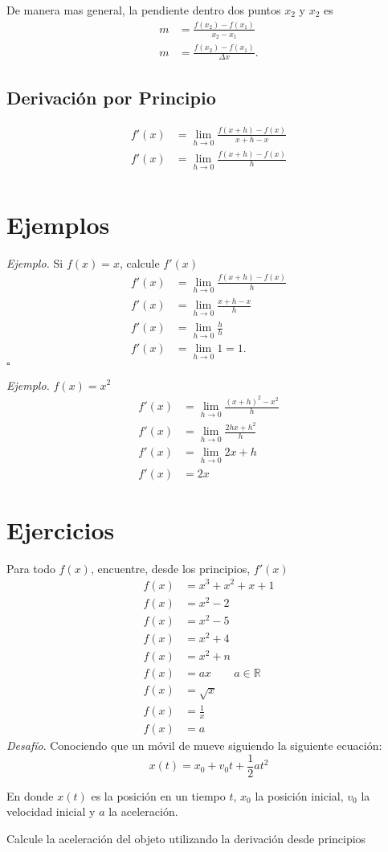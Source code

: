 \documentclass[spanish,12pt]{article}
\begin{document}
De manera mas general, la pendiente dentro dos puntos $x_2$ y $x_2$ es 
\begin{align*}
    m&=\frac{f(x_2)-f(x_1)}{x_2-x_1}\\
    m&=\frac{f(x_2)-f(x_1)}{\Delta x}.
\end{align*}
	\subsection{Derivación por Principio}
	\begin{align*}
	    f'(x)&=\lim_{h\to0}{\frac{f(x+h)-f(x)}{x+h-x}}\\
	    f'(x)&=\lim_{h\to0}{\frac{f(x+h)-f(x)}{h}}\\
	\end{align*}

\section{Ejemplos}
  \textit{Ejemplo.}  Si $f(x)=x$, calcule $f'(x)$
    \begin{align*}
        f'(x)&=\lim_{h\to0}\frac{f(x+h)-f(x)}{h}\\
        f'(x)&=\lim_{h\to0}\frac{x+h-x}{h}\\
        f'(x)&=\lim_{h\to0}\frac{h}{h}\\
        f'(x)&=\lim_{h\to0}1=1.
    \end{align*}
    \hfill $\square$
    
    \textit{Ejemplo.} $f(x)=x^2$
    \begin{align*}
	    f'(x)&=\lim_{h\to0}\frac{(x+h)^2-x^2}{h}\\
	    f'(x)&=\lim_{h\to0}{\frac{2hx+h^2}{h}}\\
	    f'(x)&=\lim_{h\to0}{2x+h}\\
	    f'(x)&=2x
	\end{align*}
\section{Ejercicios}
Para todo $f(x)$, encuentre, desde los principios, $f'(x)$
\begin{align*}
    f(x)&=x^3+x^2+x+1\\
    f(x)&=x^2-2\\
    f(x)&=x^2-5\\
    f(x)&=x^2+4\\
    f(x)&=x^2+n\\
    f(x)&=ax \quad \quad a\in \mathbb{R}\\
    f(x)&=\sqrt{x}\\
    f(x)&=\frac{1}{x}\\
    f(x)&=a
\end{align*}
\textit{Desafío}. Conociendo que un móvil de mueve siguiendo la siguiente ecuación:
$$x(t)=x_0+v_0t+\frac{1}{2}at^2$$

En donde $x(t)$ es la posición en un tiempo $t$, $x_0$ la posición inicial, $v_0$ la velocidad inicial y $a$ la aceleración.

Calcule la aceleración del objeto utilizando la derivación desde principios
\end{document}
